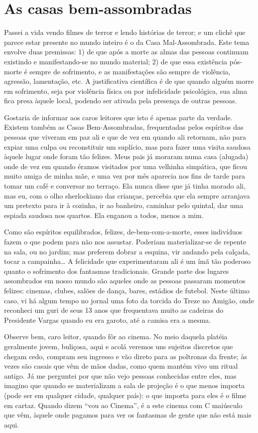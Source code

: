 \chapter{As casas bem-assombradas}

Passei a vida vendo filmes de terror e lendo histórias de terror; e um
clichê que parece estar presente no mundo inteiro é o da Casa
Mal-Assombrada. Este tema envolve duas premissas: 1) de que após a
morte as almas das pessoas continuam existindo e manifestando-se no
mundo material; 2) de que essa existência pós-morte é sempre de
sofrimento, e as manifestações são sempre de violência, agressão,
lamentação, etc. A justificativa científica é de que quando alguém
morre em sofrimento, seja por violência física ou por infelicidade
psicológica, sua alma fica presa àquele local, podendo ser ativada
pela presença de outras pessoas.

Gostaria de informar aos caros leitores que isto é apenas parte da
verdade. Existem também as Casas Bem-Assombradas, frequentadas pelos
espíritos das pessoas que viveram em paz ali e que de vez em quando
ali retornam, não para expiar uma culpa ou reconstituir um suplício,
mas para fazer uma visita saudosa àquele lugar onde foram tão
felizes. Meus pais já moraram numa casa (alugada) onde de vez em
quando éramos visitados por uma velhinha simpática, que ficou muito
amiga de minha mãe, e uma vez por mês aparecia nos fins de tarde para
tomar um café e conversar no terraço. Ela nunca disse que já tinha
morado ali, mas eu, com o olho sherlockiano das crianças, percebia
que ela sempre arranjava um pretexto para ir à cozinha, ir ao
banheiro, caminhar pelo quintal, dar uma espiada saudosa nos quartos.
Ela enganou a todos, menos a mim.

Como são espíritos equilibrados, felizes, de-bem-com-a-morte, esses
indivíduos fazem o que podem para não nos assustar. Poderiam
materializar-se de repente na sala, ou no jardim; mas preferem dobrar
a esquina, vir andando pela calçada, tocar a campainha… A felicidade
que experimentaram ali é um ímã tão poderoso quanto o sofrimento dos
fantasmas tradicionais. Grande parte dos lugares assombrados em nosso
mundo são aqueles onde as pessoas passaram momentos felizes: cinemas,
clubes, salões de dança, bares, estádios de futebol. Neste último
caso, vi há algum tempo no jornal uma foto da torcida do Treze no
Amigão, onde reconheci um guri de seus 13 anos que frequentava muito
as cadeiras do Presidente Vargas quando eu era garoto, até a camisa
era a mesma.

Observe bem, caro leitor, quando fôr ao cinema. No meio daquela
platéia geralmente jovem, buliçosa, aqui e acolá veremos uns sujeitos
discretos que chegam cedo, compram seu ingresso e vão direto para as
poltronas da frente; às vezes são casais que vêm de mãos dadas, como
quem mantém vivo um ritual antigo. Já me perguntei por que não vejo
pessoas conhecidas entre eles, mas imagino que quando se materializam
a sala de projeção é o que menos importa (pode ser em qualquer
cidade, qualquer país): o que importa para eles é o filme em cartaz.
Quando dizem “vou ao Cinema”, é a este cinema com C maiúsculo que
vêm, àquele onde pagamos para ver os fantasmas de gente que não está
mais aqui.

